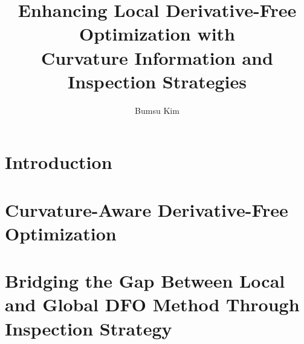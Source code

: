 \documentclass [PhD] {uclathes}
\title          {Enhancing Local Derivative-Free Optimization with\\ Curvature Information and Inspection Strategies}
\author         {Bumsu Kim}
\begin{document}
\makeintropages
%
%

\chapter{Introduction}



\chapter{Curvature-Aware Derivative-Free Optimization}


\chapter{Bridging the Gap Between Local and Global DFO Method Through Inspection Strategy}


\appendix
\chapter{}


\end{document}
